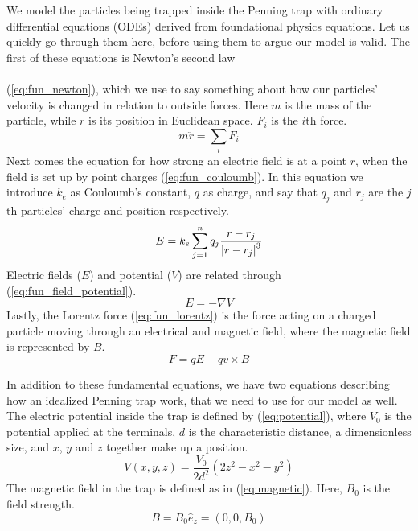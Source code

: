 We model the particles being trapped inside the Penning trap with ordinary differential equations (ODEs) derived from foundational physics equations. Let us quickly go through them here, before using them to argue our model is valid. The first of these equations is Newton's second law
\\\\
(\ref{eq:fun_newton}), which we use to say something about how our particles' velocity is changed in relation to outside forces. Here $m$ is the mass of the particle, while $r$ is its position in Euclidean space. $F_i$ is the $i$th force.
%
\begin{equation}
\label{eq:fun_newton}
m \ddot r = \sum_i F_i
\end{equation}
%
Next comes the equation for how strong an electric field is at a point $r$, when the field is set up by point charges (\ref{eq:fun_couloumb}). In this equation we introduce $k_e$ as Couloumb's constant, $q$ as charge, and say that $q_j$ and $r_j$ are the $j$th particles' charge and position respectively.
%
\begin{equation}
\label{eq:fun_couloumb}
E = k_e \sum_{j=1}^n q_j \frac{r - r_j}{\abs{r - r_j}^3}
\end{equation}
%
Electric fields ($E$) and potential ($V$) are related through (\ref{eq:fun_field_potential}).
\begin{equation}
\label{eq:fun_field_potential}
E = - \nabla V
\end{equation}
%
Lastly, the Lorentz force (\ref{eq:fun_lorentz}) is the force acting on a charged particle moving through an electrical and magnetic field, where the magnetic field is represented by $B$.
%
\begin{equation}
\label{eq:fun_lorentz}
F = qE + qv \times B 
\end{equation}

In addition to these fundamental equations, we have two equations describing how an idealized Penning trap work, that we need to use for our model as well. The electric potential inside the trap is defined by (\ref{eq:potential}), where $V_0$ is the potential applied at the terminals, $d$ is the characteristic distance, a dimensionless size, and $x$, $y$ and $z$ together make up a position.
%
\begin{equation}
\label{eq:potential}
V(x, y, z) = \frac{V_0}{2d^2}(2z^2 - x^2 - y^2)
\end{equation}
%
The magnetic field in the trap is defined as in (\ref{eq:magnetic}). Here, $B_0$ is the field strength.
%
\begin{equation}
\label{eq:magnetic}
B = B_0 \hat{e}_z = (0, 0, B_0)
\end{equation}


